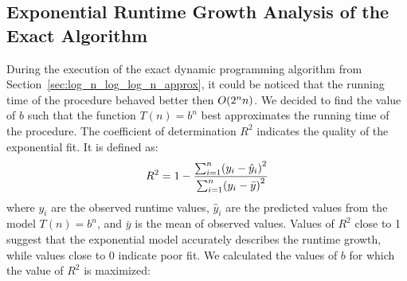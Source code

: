 \FloatBarrier
\subsection{Exponential Runtime Growth Analysis of the Exact Algorithm}
\label{sec:exact_dp_runtime_analysis}

During the execution of the exact dynamic programming algorithm from Section~\ref{sec:log_n_log_log_n_approx}, it could be noticed that the running time of the procedure behaved better then $O\mathopen{}\left( 2^nn \right)$. We decided to find the value of $b$ such that the function $T(n) = b^n$ best approximates the running time of the procedure. 
The coefficient of determination $R^2$ indicates the quality of the exponential fit. It is defined as:
$$
R^2 = 1 - \frac{\sum_{i=1}^{n}\mathopen{}\left( y_i - \hat{y}_i \right)^2}{\sum_{i=1}^{n}\mathopen{}\left( y_i - \bar{y} \right)^2}
$$
where $y_i$ are the observed runtime values, $\hat{y}_i$ are the predicted values from the model $T(n) = b^n$, and $\bar{y}$ is the mean of observed values. Values of $R^2$ close to 1 suggest that the exponential model accurately describes the runtime growth, while values close to 0 indicate poor fit.  We calculated the values of $b$ for which the value of $R^2$ is maximized:
\FloatBarrier

